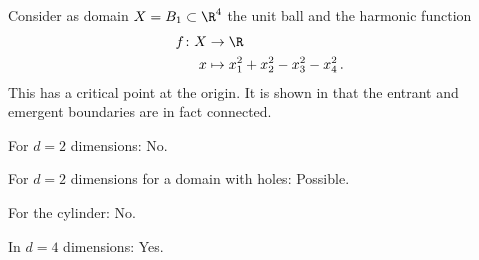 \begin{frame}
  \begin{example}[Connected entrant boundary in $d=4$ dimensions, {\autocite[Ex.\ 4.7]{Koppenhoefer2024}}]\label{ex:n4}
    Consider as domain $X=B_1\subset\R^4$ the unit ball and
    the harmonic function 
    \begin{equation*}
      \begin{aligned}
      f\colon X&\to \R \\
      x &\mapsto x_1^2+x_2^2-x_3^2-x_4^2\,.
      \end{aligned}
      \label{eq:n4_deff}
    \end{equation*}
    This has a critical point at the origin.
    It is shown in \autocite[Prop.\ 4.8]{Koppenhoefer2024} that the entrant and emergent boundaries are in fact connected.
  \end{example} 
\end{frame}

\begin{frame}

  {\questionFlowthrough
  \begin{answer}
    \begin{itemize}
      \item For $d=2$ dimensions: No.
      \item For $d=2$ dimensions for a domain with holes: Possible.
      \item For the cylinder: No.
        {\item In $d=4$ dimensions: Yes.}
    \end{itemize}
  \end{answer}}
\end{frame}


